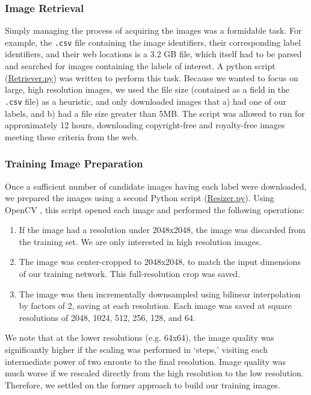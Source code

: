 \documentclass{article}
\begin{document}
\subsubsection{Image Retrieval}
Simply managing the process of acquiring the images was a formidable task. For example, the \texttt{.csv} file containing the image identifiers, their corresponding label identifiers, and their web locations is a 3.2 GB file, which itself had to be parsed and searched for images containing the labels of interest. A python script (\href{https://github.com/elbrandt/CS766_Project/blob/master/dataset/Retriever/Retriever.py}{Retriever.py}) was written to perform this task. Because we wanted to focus on large, high resolution images, we used the file size (contained as a field in the \texttt{.csv} file) as a heuristic, and only downloaded images that a) had one of our labels, and b) had a file size greater than 5MB. The script was allowed to run for approximately 12 hours, downloading copyright-free and royalty-free images meeting these criteria from the web.

\subsubsection{Training Image Preparation}
Once a sufficient number of candidate images having each label were downloaded, we prepared the images using a second Python script (\href{https://github.com/elbrandt/CS766_Project/blob/master/dataset/Retriever/Resizer.py}{Resizer.py}). Using OpenCV \cite{opencv_library}, this script opened each image and performed the following operations:
\begin{enumerate}
    \item If the image had a resolution under 2048x2048, the image was discarded from the training set. We are only interested in high resolution images.
    \item The image was center-cropped to 2048x2048, to match the input dimensions of our training network. This full-resolution crop was saved.
    \item The image was then incrementally downsampled using bilinear interpolation by factors of 2, saving at each resolution. Each image was saved at square resolutions of 2048, 1024, 512, 256, 128, and 64. 
\end{enumerate}
We note that at the lower resolutions (e.g. 64x64), the image quality was significantly higher if the scaling was performed in `steps,' visiting each intermediate power of two enroute to the final resolution. Image quality was much worse if we rescaled directly from the high resolution to the low resolution. Therefore, we settled on the former approach to build our training images.
\end{document}
